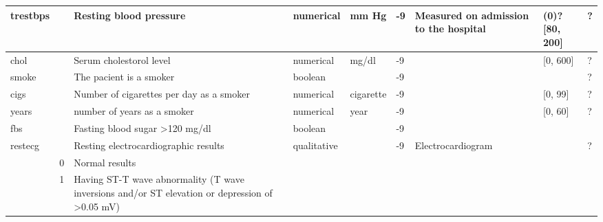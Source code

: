 \documentclass[a4paper,12pt]{article}
\begin{document}
\begin{adjustbox}{width=1\textwidth}
\begin{tabular}{|l|l|l|l|l|l|l|l|l|}
trestbps      &                    & Resting blood pressure                                     & numerical    & mm Hg                  & -9                   & Measured on admission to the hospital & (0)?[80, 200] & ?            \\ \hline
chol          &                    & Serum cholestorol level                                    & numerical    & mg/dl                  & -9                   &                                       & [0, 600]      & ?            \\ \hline
smoke         &                    & The pacient is a smoker                                    & boolean      &                        & -9                   &                                       &               & ?            \\ \hline
cigs          &                    & Number of cigarettes per day as a smoker                   & numerical    & cigarette              & -9                   &                                       & [0, 99]       & ?            \\ \hline
years         &                    & number of years as a smoker                                & numerical    & year                   & -9                   &                                       & [0, 60]       & ?            \\ \hline
fbs           &                    & Fasting blood sugar \textgreater 120 mg/dl                 & boolean      &                        & -9                   &                                       &               &              \\ \hline
restecg       &                    & Resting electrocardiographic results                       & qualitative  &                        & -9                   & Electrocardiogram                     &               & ?            \\ \hline
              & 0                  & Normal results                                             &              &                        &                      &                                       &               &              \\ \hline
              & 1                  & Having ST-T wave abnormality (T wave inversions and/or ST
                                     elevation or depression of \textgreater 0.05 mV)           &              &                        &                      &                                       &               &              \\ \hline

\end{tabular}
\end{adjustbox}
\end{document}
